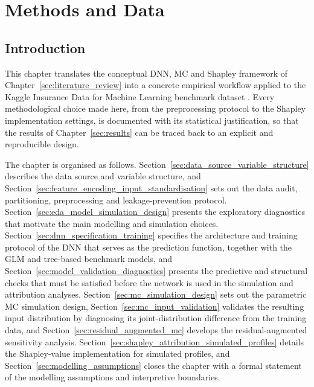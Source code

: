 
\section{Methods and Data}
\label{chap:methods_and_data}

\subsection{Introduction}
\label{sec:chapter3_introduction}

\noindent
This chapter translates the conceptual DNN, MC and Shapley framework
of Chapter~\ref{sec:literature_review} into a concrete empirical workflow
applied to the Kaggle Insurance Data for Machine Learning benchmark
dataset \citep{kaggleInsuranceDataML}.  Every methodological choice made
here, from the preprocessing protocol to the Shapley implementation
settings, is documented with its statistical justification, so that the
results of Chapter~\ref{sec:results} can be traced back to an explicit
and reproducible design.

\noindent
The chapter is organised as follows.
Section~\ref{sec:data_source_variable_structure} describes the data
source and variable structure, and
Section~\ref{sec:feature_encoding_input_standardisation} sets out the
data audit, partitioning, preprocessing and leakage-prevention protocol.
Section~\ref{sec:eda_model_simulation_design} presents the exploratory
diagnostics that motivate the main modelling and simulation choices.
Section~\ref{sec:dnn_specification_training} specifies the architecture
and training protocol of the DNN that serves as the prediction
function, together with the GLM and tree-based benchmark models,
and Section~\ref{sec:model_validation_diagnostics} presents the
predictive and structural checks that must be satisfied before the
network is used in the simulation and attribution analyses.
Section~\ref{sec:mc_simulation_design} sets out the parametric MC
simulation design, Section~\ref{sec:mc_input_validation} validates the
resulting input distribution by diagnosing its joint-distribution
difference from the training data, and
Section~\ref{sec:residual_augmented_mc} develops the residual-augmented
sensitivity analysis.  Section~\ref{sec:shapley_attribution_simulated_profiles}
details the Shapley-value implementation for simulated profiles, and
Section~\ref{sec:modelling_assumptions} closes the chapter with a formal
statement of the modelling assumptions and interpretive boundaries.

